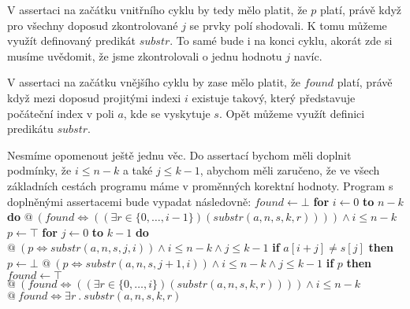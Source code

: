 \documentclass{article}
\newcommand\tab[1][0.5cm]{\hspace*{#1}}
\begin{document}
V assertaci na začátku vnitřního cyklu by tedy mělo platit, že $p$ platí, právě když pro všechny doposud zkontrolované $j$ se prvky polí shodovali. K tomu můžeme využít definovaný predikát $substr$. To samé bude i na konci cyklu, akorát zde si musíme uvědomit, že jsme zkontrolovali o jednu hodnotu $j$ navíc.

V assertaci na začátku vnějšího cyklu by zase mělo platit, že $found$ platí, právě když mezi doposud projitými indexi $i$ existuje takový, který představuje počáteční index v poli $a$, kde se vyskytuje $s$. Opět můžeme využít definici predikátu $substr$.

Nesmíme opomenout ještě jednu věc. Do assertací bychom měli doplnit podmínky, že $i \leq n - k$ a také $ j \leq k - 1$, abychom měli zaručeno, že ve všech základních cestách programu máme v proměnných korektní hodnoty. Program s doplněnými assertacemi bude vypadat následovně: \newline\newline $found \leftarrow \bot$ \newline \textbf{for} $i \leftarrow 0$ \textbf{to} $n - k$ \textbf{do} \newline \tab $@\ (found \Leftrightarrow ((\exists r \in \{0,\dots,i - 1\}) (substr(a, n, s, k, r)))) \wedge i \leq n - k$ \newline \tab $p \leftarrow \top$ \newline \tab \textbf{for} $j \leftarrow 0$ \textbf{to} $k - 1$ \textbf{do} \newline \tab \tab $@\ (p \Leftrightarrow substr( a, n, s, j, i )) \wedge i \leq n - k \wedge j \leq k - 1$ \newline \tab \tab \textbf{if} $a[i+j] \neq s[j]$ \textbf{then} \newline \tab \tab \tab $p \leftarrow \bot$ \newline \tab \tab $@\ (p \Leftrightarrow substr( a, n, s, j + 1, i )) \wedge i \leq n - k \wedge j \leq k - 1$ \newline \tab \textbf{if} $p$ \textbf{then} $found \leftarrow \top$ \newline \tab $@\ (found \Leftrightarrow ((\exists r \in \{0,\dots,i\}) (substr(a, n, s, k, r)))) \wedge i \leq n - k$ \newline $@\ found  \Leftrightarrow \exists r\ .\ substr(a, n, s, k, r)$ \newline \newline 
\end{document}
